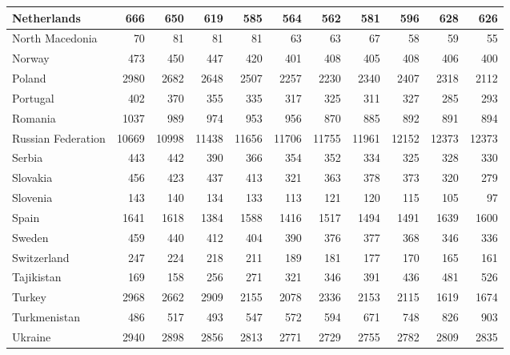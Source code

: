 \begin{table}
\begin{tabular}{|l|r|r|r|r|r|r|r|r|r|r|}
                   Netherlands&    666&    650&    619&    585&    564&    562&    581&    596&    628&    626\\\hline
               North Macedonia&     70&     81&     81&     81&     63&     63&     67&     58&     59&     55\\\hline
                        Norway&    473&    450&    447&    420&    401&    408&    405&    408&    406&    400\\\hline
                        Poland&   2980&   2682&   2648&   2507&   2257&   2230&   2340&   2407&   2318&   2112\\\hline
                      Portugal&    402&    370&    355&    335&    317&    325&    311&    327&    285&    293\\\hline
                       Romania&   1037&    989&    974&    953&    956&    870&    885&    892&    891&    894\\\hline
            Russian Federation&  10669&  10998&  11438&  11656&  11706&  11755&  11961&  12152&  12373&  12373\\\hline
                        Serbia&    443&    442&    390&    366&    354&    352&    334&    325&    328&    330\\\hline
                      Slovakia&    456&    423&    437&    413&    321&    363&    378&    373&    320&    279\\\hline
                      Slovenia&    143&    140&    134&    133&    113&    121&    120&    115&    105&     97\\\hline
                         Spain&   1641&   1618&   1384&   1588&   1416&   1517&   1494&   1491&   1639&   1600\\\hline
                        Sweden&    459&    440&    412&    404&    390&    376&    377&    368&    346&    336\\\hline
                   Switzerland&    247&    224&    218&    211&    189&    181&    177&    170&    165&    161\\\hline
                    Tajikistan&    169&    158&    256&    271&    321&    346&    391&    436&    481&    526\\\hline
                        Turkey&   2968&   2662&   2909&   2155&   2078&   2336&   2153&   2115&   1619&   1674\\\hline
                  Turkmenistan&    486&    517&    493&    547&    572&    594&    671&    748&    826&    903\\\hline
                       Ukraine&   2940&   2898&   2856&   2813&   2771&   2729&   2755&   2782&   2809&   2835\\\hline

\end{tabular}
\end{table}
